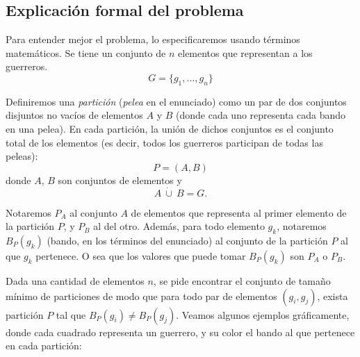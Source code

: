 
\subsection{Explicación formal del problema}

Para entender mejor el problema, lo especificaremos usando términos matemáticos. Se tiene un conjunto de $n$ elementos que representan a los guerreros. 
\[G = \{g_1,...,g_n\}\]

Definiremos una \emph{partición} (\emph{pelea} en el enunciado) como un par de dos conjuntos disjuntos no vacíos de elementos $A$ y $B$ (donde cada uno representa cada bando en una pelea). En cada partición, la unión de dichos conjuntos es el conjunto total de los elementos (es decir, todos los guerreros participan de todas las peleas):
\[ P = (A, B)\]
donde $A$, $B$ son conjuntos de elementos y  \[A \ \dot{\cup}\ B = G.\]

Notaremos $P_A$ al conjunto $A$ de elementos que representa al primer elemento de la partición $P$, y $P_B$ al del otro. Además, para todo elemento $g_k$, notaremos $B_P(g_k)$ (bando, en los t\'erminos del enunciado) al conjunto de la partición $P$ al que $g_k$ pertenece. O sea que los valores que puede tomar $B_P(g_k)$ son $P_A$ o $P_B$. 

Dada una cantidad de elementos $n$, se pide encontrar el conjunto de tamaño mínimo de particiones de modo que para todo par de elementos $(g_i, g_j)$, exista partición $P$ tal que $B_P(g_i) \neq B_P(g_j)$. Veamos algunos ejemplos gráficamente, donde cada cuadrado representa un guerrero, y su color el bando al que pertenece en cada partición:

